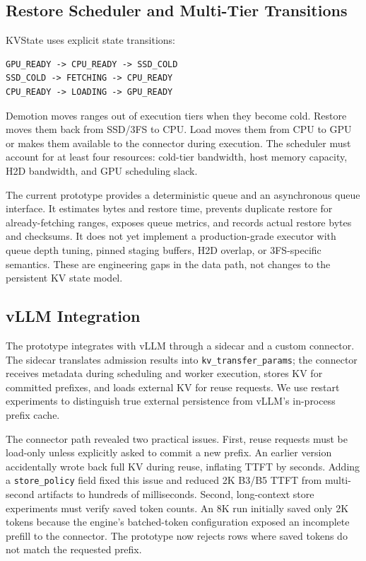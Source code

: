 \documentclass[sigconf,review,anonymous]{acmart}
\newcommand{\system}{KVState\xspace}
\begin{document}
\subsection{Restore Scheduler and Multi-Tier Transitions}

\system uses explicit state transitions:
\begin{lstlisting}
GPU_READY -> CPU_READY -> SSD_COLD
SSD_COLD -> FETCHING -> CPU_READY
CPU_READY -> LOADING -> GPU_READY
\end{lstlisting}

Demotion moves ranges out of execution tiers when they become cold. Restore
moves them back from SSD/3FS to CPU. Load moves them from CPU to GPU or makes
them available to the connector during execution. The scheduler must account for
at least four resources: cold-tier bandwidth, host memory capacity, H2D
bandwidth, and GPU scheduling slack.

The current prototype provides a deterministic queue and an asynchronous queue
interface. It estimates bytes and restore time, prevents duplicate restore for
already-fetching ranges, exposes queue metrics, and records actual restore bytes
and checksums. It does not yet implement a production-grade executor with queue
depth tuning, pinned staging buffers, H2D overlap, or 3FS-specific semantics.
These are engineering gaps in the data path, not changes to the persistent KV
state model.

\subsection{vLLM Integration}

The prototype integrates with vLLM through a sidecar and a custom connector.
The sidecar translates admission results into \texttt{kv\_transfer\_params};
the connector receives metadata during scheduling and worker execution, stores
KV for committed prefixes, and loads external KV for reuse requests. We use
restart experiments to distinguish true external persistence from vLLM's
in-process prefix cache.

The connector path revealed two practical issues. First, reuse requests must be
load-only unless explicitly asked to commit a new prefix. An earlier version
accidentally wrote back full KV during reuse, inflating TTFT by seconds. Adding
a \texttt{store\_policy} field fixed this issue and reduced 2K B3/B5 TTFT from
multi-second artifacts to hundreds of milliseconds. Second, long-context store
experiments must verify saved token counts. An 8K run initially saved only 2K
tokens because the engine's batched-token configuration exposed an incomplete
prefill to the connector. The prototype now rejects rows where saved tokens do
not match the requested prefix.
\end{document}
